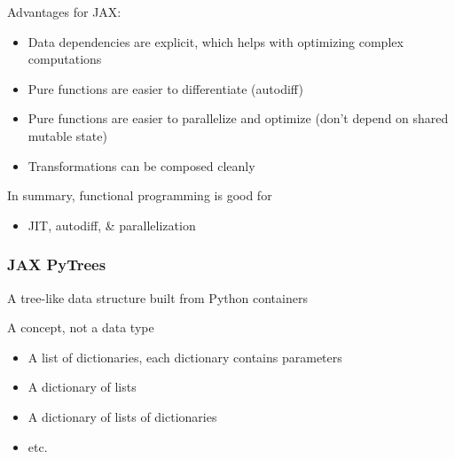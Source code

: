 \begin{frame}
    
    Advantages for JAX:

     \begin{itemize}
        \item Data dependencies are explicit, which helps with optimizing complex computations 
        \vspace{0.5em}
         \item Pure functions are easier to differentiate (autodiff)
        \vspace{0.5em}
         \item Pure functions are easier to parallelize and optimize (don't
             depend on shared mutable state)
        \vspace{0.5em}
         \item Transformations can be composed cleanly 
     \end{itemize}

        \vspace{0.5em}
        \vspace{0.5em}

     In summary, functional programming is good for 
     \begin{itemize}
         \item JIT, autodiff, \& parallelization
     \end{itemize}


\end{frame}



\begin{frame}
    \frametitle{JAX PyTrees}

    A tree-like data structure built from Python containers

    \vspace{0.5em}
    A concept, not a data type

    \vspace{0.5em}
    \vspace{0.5em}
    \vspace{0.5em}
    \Egs

    \begin{itemize}
        \item A list of dictionaries, each dictionary contains parameters
        \item A dictionary of lists 
        \item A dictionary of lists of dictionaries
        \item etc.
    \end{itemize}

\end{frame}





